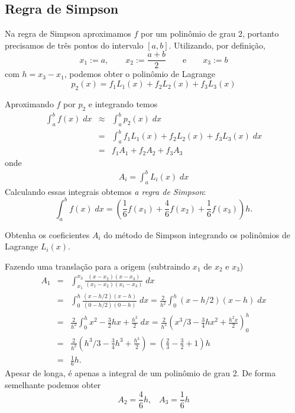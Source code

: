 \subsection{Regra de Simpson}
Na regra de Simpson aproximamos $f$ por um polinômio de grau $2$, portanto precisamos de três pontos do intervalo $[a,b]$. Utilizando, por definição,
$$
x_1:=a,\qquad x_2:=\frac{a+b}{2}\qquad \text{e}\qquad x_3:=b
$$
com $h=x_3-x_1$, podemos obter o polinômio de Lagrange
\begin{equation*}
    p_2(x) = f_1L_1(x) + f_2L_2(x)  + f_3L_3(x)
\end{equation*}

Aproximando $f$ por $p_2$ e integrando temos
\begin{eqnarray}
\int_a^bf(x)\;dx &\approx&\int_a^b p_2(x) \;dx \\
               &=&\int_a^b f_1L_1(x) + f_2L_2(x)  + f_3L_3(x) \;dx \\
               &=&f_1 A_1 + f_2A_2  + f_3A_3
\end{eqnarray}
onde
\begin{eqnarray}
  A_i = \int_a^b L_i(x) \;dx
\end{eqnarray}
Calculando essas integrais obtemos \emph{a regra de Simpson}:
$$
\int_a^bf(x)\;dx=\left(\frac{1}{6}f(x_1)+\frac{4}{6}f(x_2)+\frac{1}{6}f(x_3)\right)h.
$$

\begin{ex}
Obtenha os coeficientes $A_i$ do método de Simpson  integrando os polinômios de Lagrange $L_i(x)$.

Fazendo uma translação para a origem (subtraindo $x_1$ de $x_2$ e $x_3$)
\begin{eqnarray*}
   A_1 &=& \int_{x_1}^{x_3} \frac{(x-x_2)(x-x_3)}{(x_1-x_2)(x_1-x_3)}\;dx \\
       &=& \int_0^h \frac{(x-h/2)(x-h)}{(0-h/2)(0-h)}\;dx
        =  \frac{2}{h^2} \int_0^h (x-h/2)(x-h)\;dx \\
       &=& \frac{2}{h^2} \int_0^h x^2 -\frac{3}{2}hx+\frac{h^2}{2}\;dx
        =  \frac{2}{h^2} (x^3/3 -\frac{3}{4}hx^2+\frac{h^2x}{2})_0^h \\
       &=& \frac{2}{h^2} (h^3/3 -\frac{3}{4}h^3+\frac{h^3}{2})
        =  (\frac{2}{3}-\frac{3}{2}+1)h\\
       &=& \frac{1}{6}h.
\end{eqnarray*}
Apesar de longa, é apenas a integral de um polinômio de grau 2. De forma semelhante podemos obter
$$
A_2 = \frac{4}{6}h, \;\;\; A_3 = \frac{1}{6}h
$$
\end{ex}




